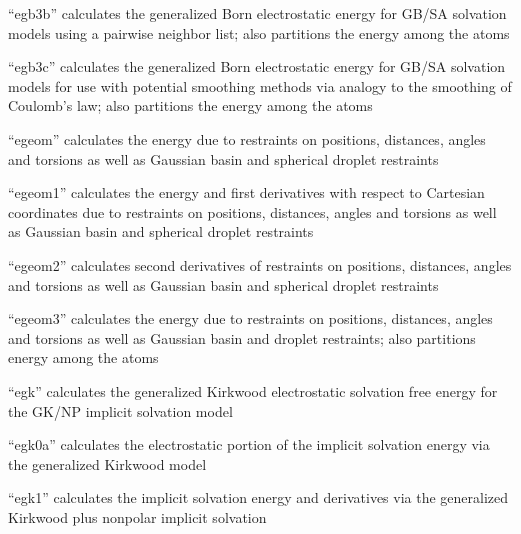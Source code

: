 \documentclass[letterpaper,11pt,english]{sphinxmanual}
\begin{document}
\sphinxAtStartPar
“egb3b” calculates the generalized Born electrostatic energy for GB/SA solvation models using a pairwise neighbor list; also partitions the energy among the atoms

\sphinxAtStartPar
{}

\sphinxAtStartPar
“egb3c” calculates the generalized Born electrostatic energy for GB/SA solvation models for use with potential smoothing methods via analogy to the smoothing of Coulomb’s law; also partitions the energy among the atoms

\sphinxAtStartPar
{}

\sphinxAtStartPar
“egeom” calculates the energy due to restraints on positions, distances, angles and torsions as well as Gaussian basin and spherical droplet restraints

\sphinxAtStartPar
{}

\sphinxAtStartPar
“egeom1” calculates the energy and first derivatives with respect to Cartesian coordinates due to restraints on positions, distances, angles and torsions as well as Gaussian basin and spherical droplet restraints

\sphinxAtStartPar
{}

\sphinxAtStartPar
“egeom2” calculates second derivatives of restraints on positions, distances, angles and torsions as well as Gaussian basin and spherical droplet restraints

\sphinxAtStartPar
{}

\sphinxAtStartPar
“egeom3” calculates the energy due to restraints on positions, distances, angles and torsions as well as Gaussian basin and droplet restraints; also partitions energy among the atoms

\sphinxAtStartPar
{}

\sphinxAtStartPar
“egk” calculates the generalized Kirkwood electrostatic solvation free energy for the GK/NP implicit solvation model

\sphinxAtStartPar
{}

\sphinxAtStartPar
“egk0a” calculates the electrostatic portion of the implicit solvation energy via the generalized Kirkwood model

\sphinxAtStartPar
{}

\sphinxAtStartPar
“egk1” calculates the implicit solvation energy and derivatives via the generalized Kirkwood plus nonpolar implicit solvation
\end{document}
